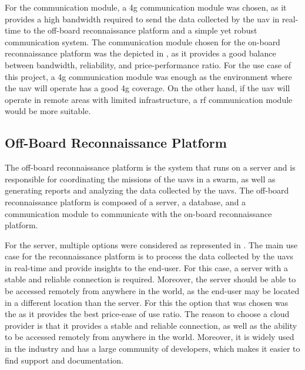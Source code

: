 

For the communication module, a \gls{4g} communication module was chosen, as it provides a high bandwidth required to send the data collected by the \gls{uav} in real-time to the off-board reconnaissance platform and a simple yet robust communication system. The communication module chosen for the on-board reconnaissance platform was the  depicted in , as it provides a good balance between bandwidth, reliability, and price-performance ratio. For the use case of this project, a \gls{4g} communication module was enough as the environment where the \gls{uav} will operate has a good \gls{4g} coverage. On the other hand, if the \gls{uav} will operate in remote areas with limited infrastructure, a \gls{rf} communication module would be more suitable.



\subsection{Off-Board Reconnaissance Platform}\label{subsec:off-board_reconnaissance_platform}

The off-board reconnaissance platform is the system that runs on a server and is responsible for coordinating the missions of the \glspl{uav} in a swarm, as well as generating reports and analyzing the data collected by the \glspl{uav}. The off-board reconnaissance platform is composed of a server, a database, and a communication module to communicate with the on-board reconnaissance platform.

For the server, multiple options were considered as represented in . The main use case for the reconnaissance platform is to process the data collected by the \glspl{uav} in real-time and provide insights to the end-user. For this case, a server with a stable and reliable connection is required. Moreover, the server should be able to be accessed remotely from anywhere in the world, as the end-user may be located in a different location than the server. For this the option that was chosen was the  as it provides the best price-ease of use ratio. The reason to choose a cloud provider is that it provides a stable and reliable connection, as well as the ability to be accessed remotely from anywhere in the world. Moreover, it is widely used in the industry and has a large community of developers, which makes it easier to find support and documentation.

